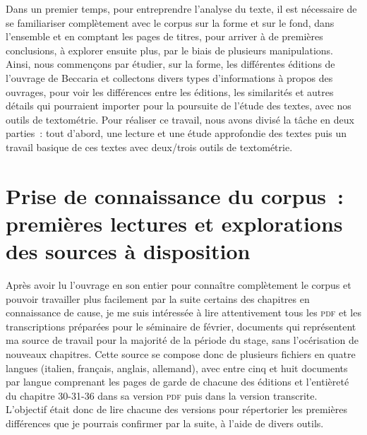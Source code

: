 
Dans un premier temps, pour entreprendre l'analyse du texte, il est nécessaire de se familiariser complètement avec le corpus sur la forme et sur le fond, dans l'ensemble et en comptant les pages de titres, pour arriver à de premières conclusions, à explorer ensuite plus, par le biais de plusieurs manipulations. Ainsi, nous commençons par étudier, sur la forme, les différentes éditions de l'ouvrage de Beccaria et collectons divers types d'informations à propos des ouvrages, pour voir les différences entre les éditions, les similarités et autres détails qui pourraient importer pour la poursuite de l'étude des textes, avec nos outils de textométrie. Pour réaliser ce travail, nous avons divisé la tâche en deux parties~: tout d'abord, une lecture et une étude approfondie des textes puis un travail basique de ces textes avec deux/trois outils de textométrie.

\section{Prise de connaissance du corpus~: premières lectures et explorations des sources à disposition}
Après avoir lu l'ouvrage en son entier pour connaître complètement le corpus et pouvoir travailler plus facilement par la suite certains des chapitres en connaissance de cause, je me suis intéressée à lire attentivement tous les \textsc{pdf} et les transcriptions préparées pour le séminaire de février, documents qui représentent ma source de travail pour la majorité de la période du stage, sans l'océrisation de nouveaux chapitres. Cette source se compose donc de plusieurs fichiers en quatre langues (italien, français, anglais, allemand), avec entre cinq et huit documents par langue comprenant les pages de garde de chacune des éditions et l'entièreté du chapitre 30-31-36 dans sa version \textsc{pdf} puis dans la version transcrite. L'objectif était donc de lire chacune des versions pour répertorier les premières différences que je pourrais confirmer par la suite, à l'aide de divers outils.


